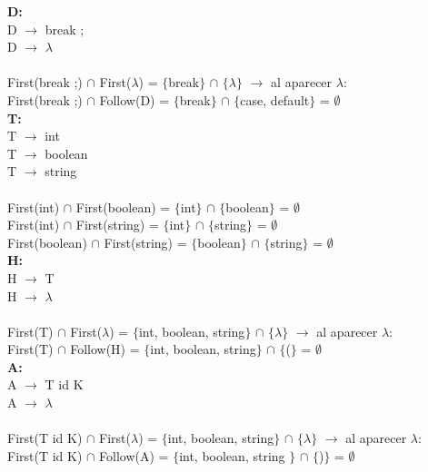 \documentclass{article}[a4paper]
\newcommand\tab[1][1cm]{\hspace*{#1}}
\begin{document}
\textbf{D:}\\
\tab D $\rightarrow$ break ;\\
\tab D $\rightarrow$ $\lambda$\\ \\
\tab \tab First(break ;) $\cap$ First($\lambda$) = $\lbrace$break$\rbrace$ $\cap$ $\lbrace$$\lambda$$\rbrace$ $\rightarrow$ al aparecer $\lambda$:\\
\tab \tab First(break ;) $\cap$ Follow(D) = $\lbrace$break$\rbrace$ $\cap$ $\lbrace$case, default$\rbrace$ = $\emptyset$\\

\textbf{T:}\\
\tab T $\rightarrow$ int\\
\tab T $\rightarrow$ boolean\\
\tab T $\rightarrow$ string\\ \\
\tab \tab First(int) $\cap$ First(boolean) = $\lbrace$int$\rbrace$ $\cap$ $\lbrace$boolean$\rbrace$ = $\emptyset$\\
\tab \tab First(int) $\cap$ First(string) = $\lbrace$int$\rbrace$ $\cap$ $\lbrace$string$\rbrace$ = $\emptyset$\\
\tab \tab First(boolean) $\cap$ First(string) = $\lbrace$boolean$\rbrace$ $\cap$ $\lbrace$string$\rbrace$ = $\emptyset$\\

\textbf{H:}\\
\tab H $\rightarrow$ T\\
\tab H $\rightarrow$ $\lambda$\\ \\
\tab \tab First(T) $\cap$ First($\lambda$) = $\lbrace$int, boolean, string$\rbrace$ $\cap$ $\lbrace$$\lambda$$\rbrace$ $\rightarrow$ al aparecer $\lambda$:\\
\tab \tab First(T) $\cap$ Follow(H) = $\lbrace$int, boolean, string$\rbrace$ $\cap$ $\lbrace$($\rbrace$ = $\emptyset$\\

\textbf{A:}\\
\tab A $\rightarrow$ T id K\\
\tab A $\rightarrow$ $\lambda$\\ \\
\tab \tab First(T id K) $\cap$ First($\lambda$) = $\lbrace$int, boolean, string$\rbrace$ $\cap$ $\lbrace$$\lambda$$\rbrace$ $\rightarrow$ al aparecer $\lambda$:\\
\tab \tab First(T id K) $\cap$ Follow(A) = $\lbrace$int, boolean, string $\rbrace$ $\cap$ $\lbrace$)$\rbrace$ = $\emptyset$\\
\end{document}
